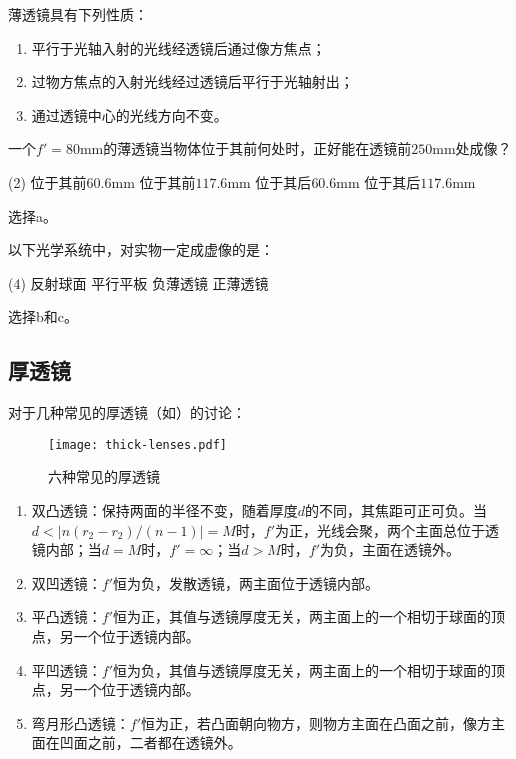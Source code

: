 \documentclass[cn,10pt,chinesefont=founder,math=newtx,cite=super,twoside]{elegantbook}
\begin{document}
\begin{property}
	薄透镜具有下列性质：
\begin{enumerate}
	\item 平行于光轴入射的光线经透镜后通过像方焦点；
	\item 过物方焦点的入射光线经过透镜后平行于光轴射出；
	\item 通过透镜中心的光线方向不变。
\end{enumerate}
\end{property}

\begin{problem}
	一个$f'=80$mm的薄透镜当物体位于其前何处时，正好能在透镜前$250$mm处成像？
	\begin{tasks}(2)
		\task 位于其前$60.6$mm
		\task 位于其前$117.6$mm
		\task 位于其后$60.6$mm
		\task 位于其后$117.6$mm
	\end{tasks}
\end{problem}
\begin{solution}
	选择a。
\end{solution}

\begin{problem}
	以下光学系统中，对实物一定成虚像的是：
	\begin{tasks}(4)
		\task 反射球面
		\task 平行平板
		\task 负薄透镜
		\task 正薄透镜
	\end{tasks}
\end{problem}
\begin{solution}
	选择b和c。
\end{solution}

\subsection{厚透镜}
\label{subsect:thick-lenses}
对于几种常见的厚透镜（如）的讨论：
\begin{figure}[htbp]
	\centering
	\texttt{[image: thick-lenses.pdf]}
	\caption{六种常见的厚透镜}
	\label{fig:thick-lenses}
\end{figure}
\begin{enumerate}
	\item 双凸透镜：保持两面的半径不变，随着厚度$d$的不同，其焦距可正可负。当$d<|n(r_2-r_2)/(n-1)|=M$时，$f'$为正，光线会聚，两个主面总位于透镜内部；当$d=M$时，$f'=\infty$；当$d>M$时，$f'$为负，主面在透镜外。
	\item 双凹透镜：$f'$恒为负，发散透镜，两主面位于透镜内部。
	\item 平凸透镜：$f'$恒为正，其值与透镜厚度无关，两主面上的一个相切于球面的顶点，另一个位于透镜内部。
	\item 平凹透镜：$f'$恒为负，其值与透镜厚度无关，两主面上的一个相切于球面的顶点，另一个位于透镜内部。
	\item 弯月形凸透镜：$f'$恒为正，若凸面朝向物方，则物方主面在凸面之前，像方主面在凹面之前，二者都在透镜外。
\end{enumerate}
\end{document}
